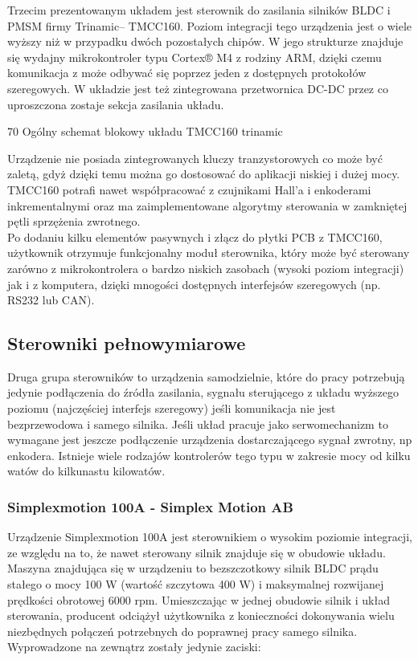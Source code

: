 Trzecim prezentowanym układem jest sterownik do zasilania silników BLDC i PMSM firmy Trinamic-- TMCC160. Poziom integracji tego urządzenia jest o wiele wyższy niż w przypadku dwóch pozostałych chipów. W jego strukturze znajduje się wydajny mikrokontroler typu Cortex® M4 z rodziny ARM, dzięki czemu komunikacja z może odbywać się poprzez jeden z dostępnych protokołów szeregowych. \linebreak W układzie jest też zintegrowana przetwornica DC-DC przez co uproszczona zostaje sekcja zasilania układu. 

	{70}
	{Ogólny schemat blokowy układu TMCC160}
	{trinamic}

Urządzenie nie posiada zintegrowanych kluczy tranzystorowych co może być zaletą, gdyż dzięki temu można go dostosować do aplikacji niskiej i dużej mocy. TMCC160 potrafi nawet współpracować z czujnikami Hall'a i enkoderami inkrementalnymi oraz ma zaimplementowane algorytmy sterowania w zamkniętej pętli sprzężenia zwrotnego. \\

Po dodaniu kilku elementów pasywnych i złącz do płytki PCB z TMCC160, użytkownik otrzymuje funkcjonalny moduł sterownika, który może być sterowany zarówno z mikrokontrolera o bardzo niskich zasobach (wysoki poziom integracji) jak i z komputera, dzięki mnogości dostępnych interfejsów szeregowych (np. RS232 lub CAN).

\subsection{Sterowniki pełnowymiarowe}

Druga grupa sterowników to urządzenia samodzielnie, które do pracy potrzebują jedynie podłączenia do źródła zasilania, sygnału sterującego z układu wyższego poziomu (najczęściej interfejs szeregowy) jeśli komunikacja nie jest bezprzewodowa i samego silnika. Jeśli układ pracuje jako serwomechanizm to wymagane jest jeszcze podłączenie urządzenia dostarczającego sygnał zwrotny, np enkodera. Istnieje wiele rodzajów kontrolerów tego typu w zakresie mocy od kilku watów do kilkunastu kilowatów. 

\subsubsection{Simplexmotion 100A - Simplex Motion AB}
\label{sss:simplex}

Urządzenie Simplexmotion 100A jest sterownikiem o wysokim poziomie integracji, ze względu na to, że nawet sterowany silnik znajduje się w obudowie układu. Maszyna znajdująca się w urządzeniu to bezszczotkowy silnik BLDC prądu stałego o mocy 100 W (wartość szczytowa 400 W) i maksymalnej rozwijanej prędkości obrotowej 6000 rpm. Umieszczając w jednej obudowie silnik i układ sterowania, producent odciążył użytkownika z konieczności dokonywania wielu niezbędnych połączeń potrzebnych do poprawnej pracy samego silnika. Wyprowadzone na zewnątrz zostały jedynie zaciski:

